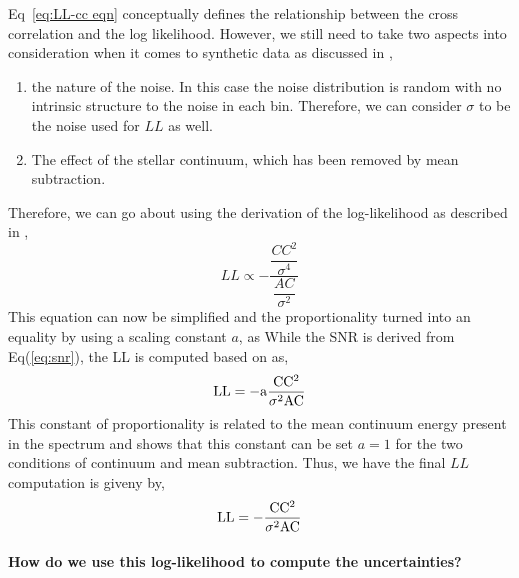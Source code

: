 Eq~\ref{eq:LL-cc eqn} conceptually defines the relationship between the cross correlation and the log likelihood. 
However, we still need to take two aspects into consideration when it comes to synthetic data as discussed in \cite{2019Brogi},
\begin{enumerate}
    \item the nature of the noise. In this case the noise distribution is random with no intrinsic structure to the noise in each bin. Therefore, we can consider $\sigma$ to be the noise used for $LL$ as well.
    \item The effect of the stellar continuum, which has been removed by mean subtraction.
\end{enumerate}
Therefore, we can go about using the derivation of the log-likelihood as described in \cite{ruffio2019radial},
\begin{equation}
LL \propto -\dfrac{\dfrac{CC^2}{\sigma^4}}{\dfrac{AC}{\sigma^2}}
\end{equation}
This equation can now be simplified and the proportionality turned into an equality by using a scaling constant $a$, as
 While the SNR is derived from Eq(\ref{eq:snr}), the LL is computed based on \cite{ruffio2019radial} as,
 \begin{equation}
     \rm{LL}=-a\rm{\frac{CC^2}{\sigma^{2}AC}}
\end{equation}
This constant of proportionality is related to the mean continuum energy present in the spectrum and \cite{2003Zucker} shows that this constant can be set $a=1$ for the two conditions of continuum and mean subtraction.
Thus, we have the final $LL$ computation is giveny by,
 \begin{equation}
     \rm{LL}=-\rm{\frac{CC^2}{\sigma^{2}AC}}
     \label{eq:LL}
 \end{equation}

\paragraph{How do we use this log-likelihood to compute the uncertainties?\\}

